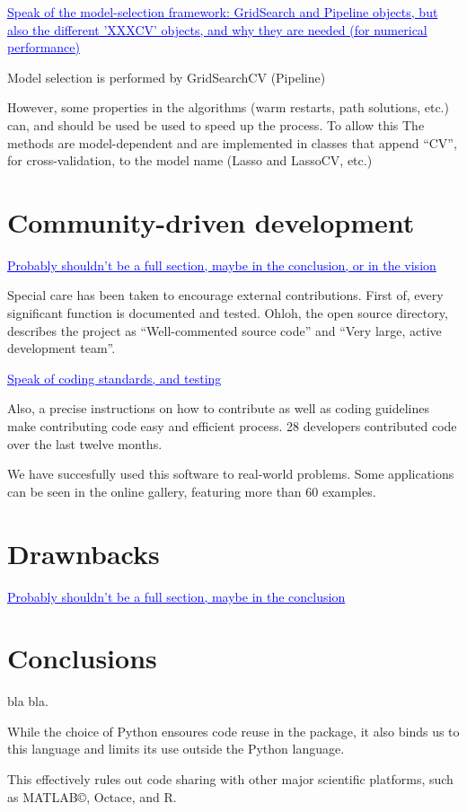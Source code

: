 \documentclass[twoside,11pt]{article}
\newcommand{\GAEL}[1]{\textcolor{blue}{\uline{#1}}}
\begin{document}
\GAEL{Speak of the model-selection framework: GridSearch and Pipeline
objects, but also the different 'XXXCV' objects, and why they are needed
(for numerical performance)}

Model selection is performed by GridSearchCV (Pipeline)

However, some properties in the algorithms (warm restarts, path
solutions, etc.) can, and should be used be used to speed up the
process. To allow this The methods are model-dependent and are
implemented in classes that append ``CV'', for cross-validation, to
the model name (Lasso and LassoCV, etc.)


\section{Community-driven development}

\GAEL{Probably shouldn't be a full section, maybe in the conclusion, or
in the vision}

Special care has been taken to encourage external contributions. First
of, every significant function is documented and tested.  Ohloh, the
open source directory, describes the project as ``Well-commented
source code'' and ``Very large, active development team''.

\GAEL{Speak of coding standards, and testing} 

Also, a precise instructions on how to contribute as well as coding
guidelines make contributing code easy and efficient process. 28
developers contributed code over the last twelve months.

We have succesfully used this software to real-world problems. Some
applications can be seen in the online gallery, featuring more than 60
examples.


\section{Drawnbacks}

\GAEL{Probably shouldn't be a full section, maybe in the conclusion}



\section{Conclusions}

bla bla.

While the choice of Python ensoures code reuse in the package, it also
binds us to this language and limits its use outside the Python
language.

This effectively rules out code sharing with other major scientific
platforms, such as MATLAB©, Octace, and R.
\end{document}
